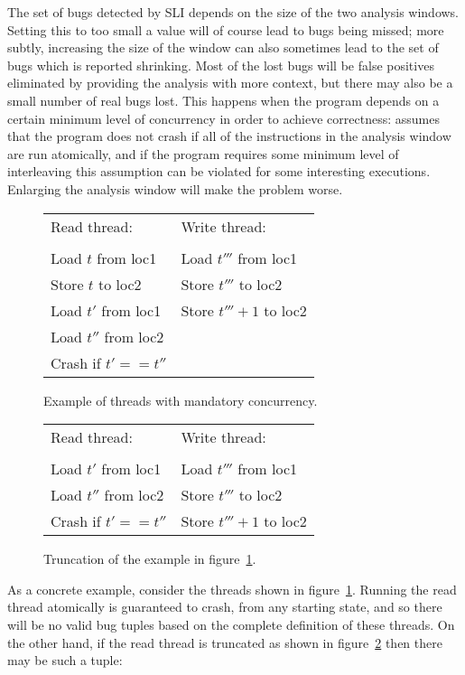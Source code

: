 
The set of bugs detected by SLI depends on the size of the two
analysis windows.  Setting this to too small a value will of course
lead to bugs being missed; more subtly, increasing the size of the
window can also sometimes lead to the set of bugs which is reported
shrinking.  Most of the lost bugs will be false positives eliminated
by providing the analysis with more context, but there may also be a
small number of real bugs lost.  This happens when the program depends
on a certain minimum level of concurrency in order to achieve
correctness: {\technique} assumes that the program does not crash if
all of the instructions in the analysis window are run atomically, and
if the program requires some minimum level of interleaving this
assumption can be violated for some interesting executions.  Enlarging
the analysis window will make the problem worse.

\begin{figure}
\begin{tabular}{ll}
Read thread:         & Write thread: \\
\\
Load $t$ from loc1   & Load $t'''$ from loc1 \\
Store $t$ to loc2    & Store $t'''$ to loc2 \\
Load $t'$ from loc1  & Store $t''' + 1$ to loc2 \\
Load $t''$ from loc2 & \\
Crash if $t' == t''$ & \\
\end{tabular}
\label{fig:mandatory_concurrency1}
\caption{Example of threads with mandatory concurrency.}
\end{figure}

\begin{figure}
\begin{tabular}{ll}
Read thread:          & Write thread: \\
\\
Load $t'$ from loc1   & Load $t'''$ from loc1 \\
Load $t''$ from loc2  & Store $t'''$ to loc2 \\
Crash if $t' == t''$  & Store $t''' + 1$ to loc2
\end{tabular}
\label{fig:mandatory_concurrency2}
\caption{Truncation of the example in figure~\ref{fig:mandatory_concurrency1}.}
\end{figure}

As a concrete example, consider the threads shown in
figure~\ref{fig:mandatory_concurrency1}.  Running the read thread
atomically is guaranteed to crash, from any starting state, and so
there will be no valid bug tuples based on the complete definition of
these threads.  On the other hand, if the read thread is truncated as
shown in figure~\ref{fig:mandatory_concurrency2} then there may be
such a tuple:

